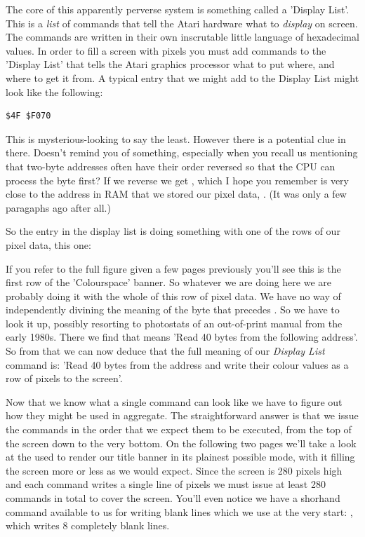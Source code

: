 The core of this apparently perverse system is something called a 'Display List'. This is a \textit{list} of commands that
tell the Atari hardware what to \textit{display} on screen. The commands are written in their own inscrutable little language
of hexadecimal values. In order to fill a screen with pixels you must add commands to the 'Display List' that tells the
Atari graphics processor what to put where, and where to get it from. A typical entry that we might add to the Display List
might look like the following:

\begin{lstlisting}
$4F $F070
\end{lstlisting}

This is mysterious-looking to say the least. However there is a potential clue in there. Doesn't  remind you of
something, especially when you recall us mentioning that two-byte addresses often have their order reversed so that the CPU
can process the  byte first? If we reverse  we get , which I hope you
remember is very close to the address in RAM that we stored our pixel data, . (It was only a few paragaphs ago after all.)

So the entry in the display list is doing something with one of the rows of our pixel data, this one:


\vspace{-1cm}

If you refer to the full figure given a few pages previously you'll see this is the first row of the 'Colourspace' banner.
So whatever we are doing here we are probably doing it with the whole of this row of pixel data.
We have no way of independently divining the meaning of the byte  that precedes . So we have
to look it up, possibly resorting to photostats of an out-of-print manual from the early 1980s. There we find that
 means 'Read 40 bytes from the following address'. So from that we can now deduce that the full meaning
of  our \textit{Display
List} command is: 'Read 40 bytes from the address  and write their colour values as a row of pixels to the screen'.

Now that we know what a single  command can look like we have to figure out how they might be used in aggregate.
The straightforward answer is that we issue the commands in the order that we expect them to be executed, from the top of the screen
down to the very bottom. On the following two pages we'll take a look at the  used to render our title
banner in its plainest possible mode, with it filling the screen more or less as we would expect. Since the screen is 280 pixels
high and each command writes a single line of pixels we must issue at least 280 commands in total to cover the screen. You'll even
notice we have a shorhand command available to us for writing blank lines which we use at the very start: , which
writes 8 completely blank lines.


